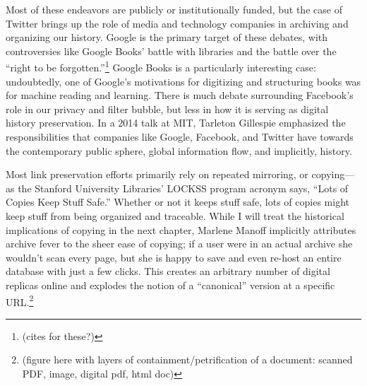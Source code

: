 

Most of these endeavors are publicly or institutionally funded, but the case of Twitter brings up the role of media and technology companies in archiving and organizing our history. Google is the primary target of these debates, with controversies like Google Books' battle with libraries and the battle over the ``right to be forgotten.''\footnote{(cites for these?)} Google Books is a particularly interesting case: undoubtedly, one of Google's motivations for digitizing and structuring books was for machine reading and learning. There is much debate surrounding Facebook's role in our privacy and filter bubble, but less in how it is serving as digital history preservation. In a 2014 talk at MIT, Tarleton Gillespie emphasized the responsibilities that companies like Google, Facebook, and Twitter have towards the contemporary public sphere, global information flow, and implicitly, history.\autocite{gillespie_algorithms_????}

Most link preservation efforts primarily rely on repeated mirroring, or copying---as the Stanford University Libraries' LOCKSS program acronym says, ``Lots of Copies Keep Stuff Safe.''\autocite{http://www.lockss.org/} Whether or not it keeps stuff safe, lots of copies might keep stuff from being organized and traceable. While I will treat the historical implications of copying in the next chapter, Marlene Manoff implicitly attributes archive fever to the sheer ease of copying; if a user were in an actual archive she wouldn’t scan every page, but she is happy to save and even re-host an entire database with just a few clicks.\autocite[386]{manoff_archive_2010} This creates an arbitrary number of digital replicas online and explodes the notion of a ``canonical'' version at a specific URL.\footnote{(figure here with layers of containment/petrification of a document: scanned PDF, image, digital pdf, html doc)}

